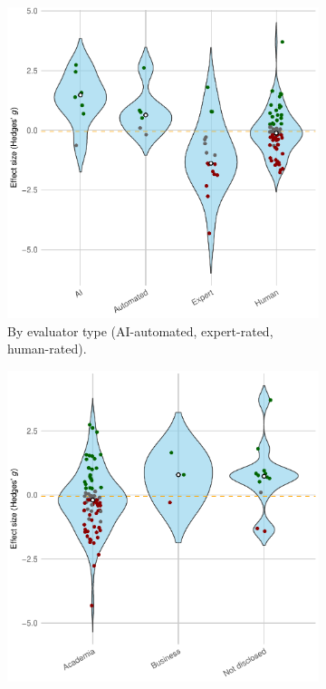 \documentclass[manuscript, screen, review, acmsmall, anonymous]{acmart}
\begin{document}
\begin{figure}[H]
  \centering
  \begin{subfigure}[t]{0.49\linewidth}
    \centering
    \includegraphics[width=\linewidth]{plot_versus_raw_violin_Measurement_Evaluator}
    \caption{By evaluator type (AI-automated, expert-rated, human-rated).}
    \label{fig:versus_raw_violin_evaluator}
  \end{subfigure}%
  \hfill
  \begin{subfigure}[t]{0.49\linewidth}
    \centering
    \includegraphics[width=\linewidth]{plot_versus_raw_violin_Participants}

\end{subfigure}
\end{figure}
\end{document}
